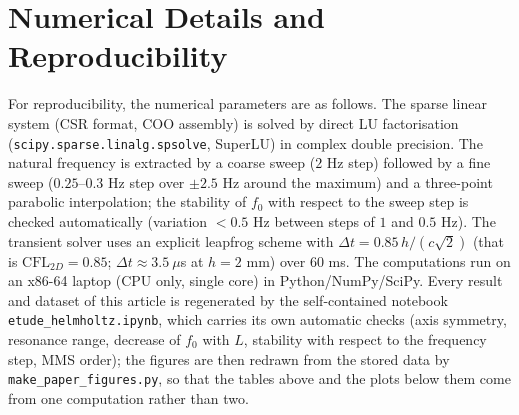 \documentclass[11pt,a4paper,twocolumn]{article}
\begin{document}
\section{Numerical Details and Reproducibility}
\label{sec:repro}
For reproducibility, the numerical parameters are as follows. The sparse linear system (CSR format, COO assembly) is solved by direct LU factorisation (\texttt{scipy.sparse.linalg.spsolve}, SuperLU) in complex double precision. The natural frequency is extracted by a coarse sweep ($2$ Hz step) followed by a fine sweep ($0.25$--$0.3$ Hz step over $\pm2.5$ Hz around the maximum) and a three-point parabolic interpolation; the stability of $f_0$ with respect to the sweep step is checked automatically (variation $<0.5$ Hz between steps of $1$ and $0.5$ Hz). The transient solver uses an explicit leapfrog scheme with $\Delta t = 0.85\,h/(c\sqrt{2})$ (that is $\mathrm{CFL}_{2D}=0.85$; $\Delta t \approx 3.5\ \mu$s at $h=2$ mm) over $60$ ms. The computations run on an x86-64 laptop (CPU only, single core) in Python/NumPy/SciPy. Every result and dataset of this article is regenerated by the self-contained notebook \texttt{etude\_helmholtz.ipynb}, which carries its own automatic checks (axis symmetry, resonance range, decrease of $f_0$ with $L$, stability with respect to the frequency step, MMS order); the figures are then redrawn from the stored data by \texttt{make\_paper\_figures.py}, so that the tables above and the plots below them come from one computation rather than two.
\end{document}
